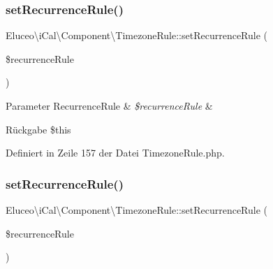 \subsubsection{\texorpdfstring{set\+Recurrence\+Rule()}{setRecurrenceRule()}\hspace{0.1cm}{\footnotesize\ttfamily [1/3]}}
{\footnotesize\ttfamily Eluceo\textbackslash{}i\+Cal\textbackslash{}\+Component\textbackslash{}\+Timezone\+Rule\+::set\+Recurrence\+Rule (\begin{DoxyParamCaption}\item[{\mbox{\hyperlink{class_eluceo_1_1i_cal_1_1_property_1_1_event_1_1_recurrence_rule}{Recurrence\+Rule}}}]{\$recurrence\+Rule }\end{DoxyParamCaption})}


\begin{DoxyParams}[1]{Parameter}
Recurrence\+Rule & {\em \$recurrence\+Rule} & \\
\hline
\end{DoxyParams}
\begin{DoxyReturn}{Rückgabe}
\$this 
\end{DoxyReturn}


Definiert in Zeile 157 der Datei Timezone\+Rule.\+php.

\mbox{\label{class_eluceo_1_1i_cal_1_1_component_1_1_timezone_rule_aa74485780bd11e82c18720d6bba9b3b4}} 
\subsubsection{\texorpdfstring{set\+Recurrence\+Rule()}{setRecurrenceRule()}\hspace{0.1cm}{\footnotesize\ttfamily [2/3]}}
{\footnotesize\ttfamily Eluceo\textbackslash{}i\+Cal\textbackslash{}\+Component\textbackslash{}\+Timezone\+Rule\+::set\+Recurrence\+Rule (\begin{DoxyParamCaption}\item[{\mbox{\hyperlink{class_eluceo_1_1i_cal_1_1_property_1_1_event_1_1_recurrence_rule}{Recurrence\+Rule}}}]{\$recurrence\+Rule }\end{DoxyParamCaption})}


